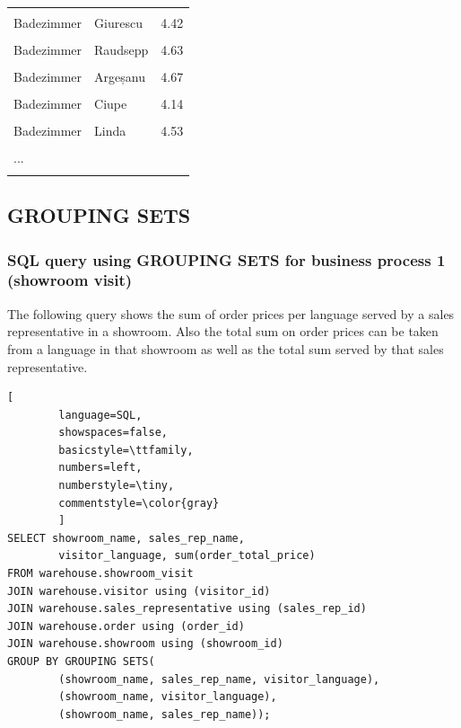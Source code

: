 \documentclass[letterpaper,12pt]{article}
\begin{document}
\begin{longtable}{p{4cm}p{4.3cm}p{2cm}}
        \hline \\
        Badezimmer & Giurescu & 4.42 \\
        \hline \\
        Badezimmer & Raudsepp & 4.63 \\
        \hline \\
        Badezimmer & Argeșanu & 4.67 \\
        \hline \\
        Badezimmer & Ciupe & 4.14 \\
        \hline \\
        Badezimmer & Linda & 4.53 \\
        \hline \\
        ... \\
        \hline \\
\end{longtable} 
\endgroup  

\subsection{GROUPING SETS}

\subsubsection{SQL query using GROUPING SETS for business process 1 (showroom visit)}

The following query shows the sum of order prices per language served by a sales representative in a showroom. Also the total sum on order prices can be taken from a language in that showroom as well as the total sum served by that sales representative.

\begin{lstlisting}[
        language=SQL,
        showspaces=false,
        basicstyle=\ttfamily,
        numbers=left,
        numberstyle=\tiny,
        commentstyle=\color{gray}
        ]
SELECT showroom_name, sales_rep_name, 
        visitor_language, sum(order_total_price)
FROM warehouse.showroom_visit
JOIN warehouse.visitor using (visitor_id)
JOIN warehouse.sales_representative using (sales_rep_id)
JOIN warehouse.order using (order_id)
JOIN warehouse.showroom using (showroom_id)
GROUP BY GROUPING SETS(
        (showroom_name, sales_rep_name, visitor_language),
        (showroom_name, visitor_language),
        (showroom_name, sales_rep_name));
\end{lstlisting} 
\end{document}

